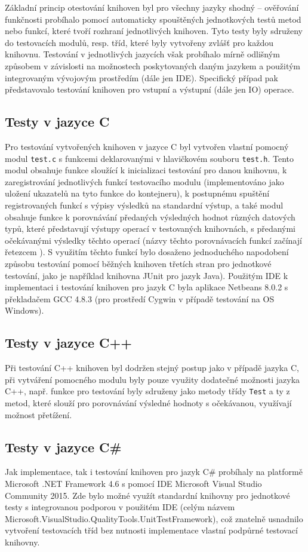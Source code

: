\documentclass[onepage, a4paper, 12pt]{bakalarka}
\begin{document}
Základní princip otestování knihoven byl pro všechny jazyky shodný -- ověřování funkčnosti probíhalo pomocí automaticky spouštěných jednotkových testů metod nebo funkcí, které tvoří rozhraní jednotlivých knihoven. Tyto testy byly sdruženy do testovacích modulů, resp. tříd, které byly vytvořeny zvlášť pro každou knihovnu. Testování v jednotlivých jazycích však probíhalo mírně odlišným způsobem v závislosti na možnostech poskytovaných daným jazykem a použitým integrovaným vývojovým prostředím (dále jen IDE). Specifický případ pak představovalo testování knihoven pro vstupní a výstupní (dále jen IO) operace.

\subsection{Testy v jazyce C}
Pro testování vytvořených knihoven v jazyce C byl vytvořen vlastní pomocný modul \texttt{test.c} s funkcemi deklarovanými v hlavičkovém souboru \texttt{test.h}. Tento modul obsahuje funkce sloužící k inicializaci testování pro danou knihovnu, k zaregistrování jednotlivých funkcí testovacího modulu (implementováno jako uložení ukazatelů na tyto funkce do kontejneru), k postupnému spuštění registrovaných funkcí s výpisy výsledků na standardní výstup, a také modul obsahuje funkce k porovnávání předaných výsledných hodnot různých datových typů, které představují výstupy operací v testovaných knihovnách, s předanými očekávanými výsledky těchto operací (názvy těchto porovnávacích funkcí začínají řetezcem ). S využitím těchto funkcí bylo dosaženo jednoduchého napodobení způsobu testování pomocí běžných knihoven třetích stran pro jednotkové testování, jako je například knihovna JUnit pro jazyk Java). Použitým IDE k implementaci i testování knihoven pro jazyk C byla aplikace Netbeans 8.0.2 s překladačem GCC 4.8.3 (pro prostředí Cygwin v případě testování na OS Windows).

\subsection{Testy v jazyce C++}
Při testování C++ knihoven byl dodržen stejný postup jako v případě jazyka C, při vytváření pomocného modulu byly pouze využity dodatečné možnosti jazyka C++, např. funkce pro testování byly sdruženy jako metody třídy \texttt{Test} a ty z metod, které slouží pro porovnávání výsledné hodnoty s očekávanou, využívají možnost přetížení.

\subsection{Testy v jazyce C\#}
Jak implementace, tak i testování knihoven pro jazyk C\# probíhaly na platformě Microsoft .NET Framework 4.6 s pomocí IDE Microsoft Visual Studio Community 2015. Zde bylo možné využít standardní knihovny pro jednotkové testy s integrovanou podporou v použitém IDE (celým názvem Microsoft.VisualStudio.QualityTools.UnitTestFramework), což znatelně usnadnilo vytvoření testovacích tříd bez nutnosti implementace vlastní podpůrné testovací knihovny.
\end{document}
